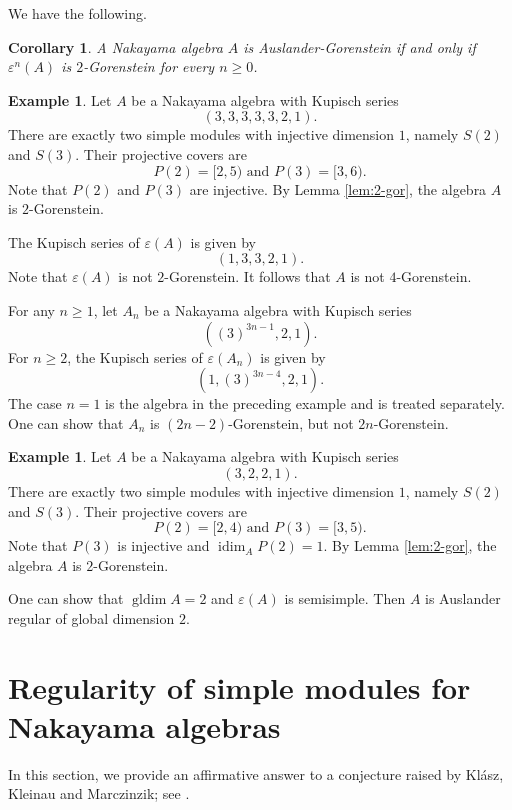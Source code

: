 \documentclass[a4paper,reqno]{amsart}
\numberwithin{equation}{section}
\theoremstyle{plain}
\newtheorem{cor}[thm]{Corollary}
\theoremstyle{definition}
\newtheorem{exam}[defn]{Example}
\theoremstyle{remark}
\DeclareMathOperator{\idim}{idim}
\DeclareMathOperator{\gldim}{gldim}
\renewcommand{\-}{\mbox{-}}
\begin{document}
We have the following.

\begin{cor}
A Nakayama algebra  \(A\)  is Auslander-Gorenstein if and only if
\(\varepsilon^n(A)\) is \(2\)-Gorenstein for every \(n\ge 0\).
\end{cor}   



\begin{exam}
Let \(A\) be a Nakayama algebra with Kupisch series 
\[(3,3,3,3,3,2,1).\]
There are exactly two simple modules with injective dimension \(1\), 
namely \(S(2)\) and \(S(3)\).
Their projective covers are
\[P(2)=[2,5) \text{ and }  P(3)=[3,6).\]
Note that \(P(2)\) and \(P(3)\) are injective.
By Lemma \ref{lem:2-gor}, the algebra \(A\) is \(2\)-Gorenstein.

The Kupisch series of \(\varepsilon(A)\) is given by
\[(1,3,3,2,1).\]
Note that \(\varepsilon(A)\) is not \(2\)-Gorenstein.
It follows that \(A\) is not \(4\)-Gorenstein.

For any \(n\geq 1\), let \(A_n\) be a Nakayama algebra with Kupisch series 
\[((3)^{3n-1},2,1).\]
For $n\geq2$,  the Kupisch series of  \(\varepsilon(A_n)\) is given by
\[(1,(3)^{3n-4},2,1).\]
The case $n=1$ is the algebra in the preceding example and is treated separately.
One can show that \(A_n\) is \((2n-2)\)-Gorenstein, but not \(2n\)-Gorenstein.
\end{exam}


\begin{exam}
Let \(A\) be a Nakayama algebra with Kupisch series 
\[(3,2,2,1).\]
There are exactly two simple modules with injective dimension \(1\), 
namely \(S(2)\) and \(S(3)\).
Their projective covers are
\[P(2)=[2,4) \text{ and }  P(3)=[3,5).\]
Note that \(P(3)\) is injective and \(\idim_AP(2)=1\).
By Lemma \ref{lem:2-gor}, the algebra \(A\) is \(2\)-Gorenstein.


One can show that  \(\gldim A=2\)  and 
\(\varepsilon(A)\) is semisimple.
Then \(A\) is Auslander regular of global dimension \(2\).
\end{exam}


\section{Regularity of simple modules for Nakayama algebras}

In this section,  we provide an affirmative answer to a conjecture 
raised by Kl\'asz, Kleinau and Marczinzik; see \cite[5]{KKM26}.
\end{document}
